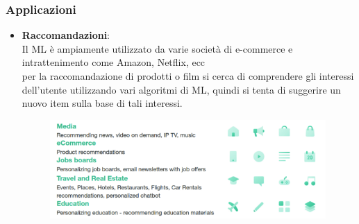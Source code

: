 \begin{frame}
	
	\frametitle{Applicazioni}
		\begin{itemize}
			\item \textbf{Raccomandazioni}:\\
				Il ML è ampiamente utilizzato da varie società di e-commerce e intrattenimento come Amazon, Netflix, ecc \\
				per la raccomandazione di prodotti o film si cerca di comprendere gli interessi dell'utente utilizzando vari algoritmi di ML, quindi si tenta di suggerire un nuovo item sulla base di tali interessi.
				\begin{figure}[!htbp]
					\centering
					\includegraphics[width=10.5cm]{images/intro/recommendations_examples.png}
				\end{figure}
		\end{itemize}		

\end{frame}


